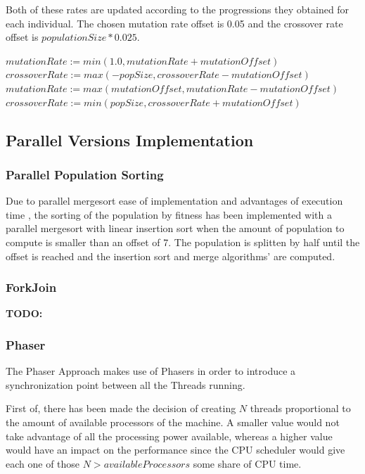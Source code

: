 \documentclass[runningheads]{llncs}
\begin{document}
Both of these rates are updated according to the progressions they obtained for each individual. The chosen mutation rate offset is 0.05 and the crossover rate offset is \(populationSize * 0.025\).

\begin{algorithmic}
        \State $mutationRate := min(1.0, mutationRate + mutationOffset)$
        \State $crossoverRate := max(-popSize, crossoverRate - mutationOffset)$
\EndIf
{}
        \State $mutationRate := max(mutationOffset, mutationRate - mutationOffset)$
        \State $crossoverRate := min(popSize, crossoverRate + mutationOffset)$
\EndIf
\end{algorithmic}

\subsection{Parallel Versions Implementation}
\subsubsection{Parallel Population Sorting} \label{subsubsec:parallelSort} \hfill \par
Due to parallel mergesort ease of implementation and advantages of execution time \cite{analysisMergeSort}, the sorting of the population by fitness has been implemented with a parallel mergesort with linear insertion sort when the amount of population to compute is smaller than an offset of 7. The population is splitten by half until the offset is reached and the insertion sort and merge algorithms' are computed.


\subsubsection{ForkJoin} \hfill \par
\textbf{TODO:}

\subsubsection{Phaser} \hfill \par
The Phaser Approach makes use of Phasers in order to introduce a synchronization point between all the Threads running. 

First of, there has been made the decision of creating \(N\) threads proportional to the amount of available processors of the machine. A smaller value would not take advantage of all the processing power available, whereas a higher value would have an impact on the performance since the CPU scheduler would give each one of those \(N > availableProcessors\) some share of CPU time.
\end{document}
